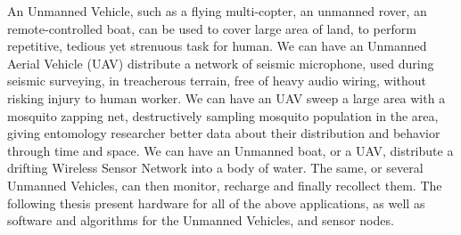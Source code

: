 

An Unmanned Vehicle, such as a flying multi-copter, an unmanned rover, an remote-controlled boat, can be used to cover large area of land, to perform repetitive, tedious yet strenuous task for human.
We can have an Unmanned Aerial Vehicle (UAV) distribute a network of seismic microphone, used during seismic surveying, in treacherous terrain, free of heavy audio wiring, without risking injury to human worker.
We can have an UAV sweep a large area with a mosquito zapping net, destructively sampling mosquito population in the area, giving entomology researcher better data about their distribution and behavior through time and space.
We can have an Unmanned boat, or a UAV, distribute a drifting Wireless Sensor Network into a body of water.
The same, or several Unmanned Vehicles, can then monitor, recharge and finally recollect them.
The following thesis present hardware for all of the above applications, as well as software and algorithms for the Unmanned Vehicles, and sensor nodes.

